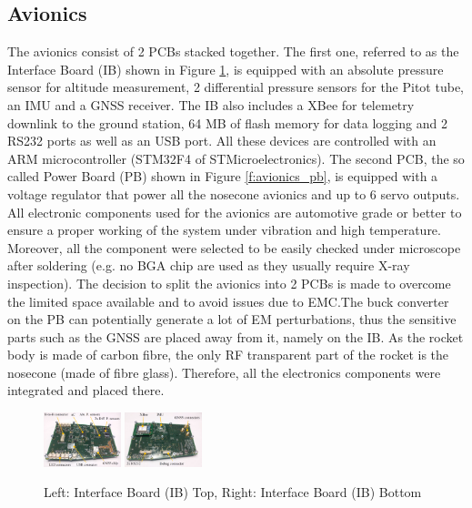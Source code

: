  
\subsection{Avionics}
The avionics consist of 2 PCBs stacked together. The first one, referred to as the Interface Board (IB) shown in Figure \ref{f:avionics_ib}, is equipped with an absolute pressure sensor for altitude measurement, 2 differential pressure sensors for the Pitot tube, an IMU and a GNSS receiver. The IB also includes a XBee for telemetry downlink to the ground station, 64 MB of flash memory for data logging and 2 RS232 ports as well as an USB port. All these devices are controlled with an ARM microcontroller (STM32F4 of STMicroelectronics). The second PCB, the so called Power Board (PB) shown in Figure \ref{f:avionics_pb}, is equipped with a voltage regulator that power all the nosecone avionics and up to 6 servo outputs. All electronic components used for the avionics are automotive grade or better to ensure a proper working of the system under vibration and high temperature. Moreover, all the component were selected to be easily checked under microscope after soldering (e.g. no BGA chip are used as they usually require X-ray inspection).
The decision to split the avionics into 2 PCBs is made to overcome the limited space available and to avoid issues due to EMC.The buck converter on the PB can potentially generate a lot of EM perturbations, thus the sensitive parts such as the GNSS are placed away from it, namely on the IB.
As the rocket body is made of carbon fibre, the only RF transparent part of the rocket is the nosecone (made of fibre glass). Therefore, all the electronics components were integrated and placed there.

 \begin{figure}[h!]
 	\centering
        \includegraphics[width=0.20\textwidth]{img/AV_FIG_IB_top.PNG}
          \includegraphics[width=0.20\textwidth]{img/AV_FIG_IB_bottom.PNG}
        \caption{Left: Interface Board (IB) Top, Right: Interface Board (IB) Bottom}
        \label{f:avionics_ib}
 \end{figure}
 
